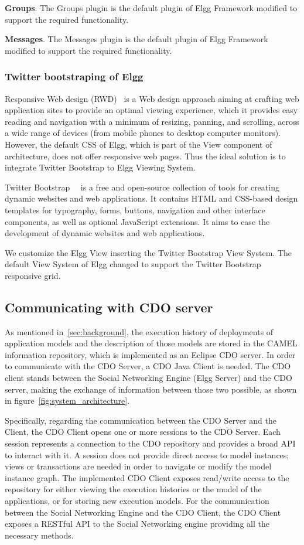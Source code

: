 \textbf{Groups}. The Groups plugin is the default plugin of Elgg Framework modified to support the required functionality.

\textbf{Messages}. The Messages plugin is the default plugin of Elgg Framework modified to support the required functionality.

\subsubsection{Twitter bootstraping of Elgg}
Responsive Web design (RWD)~\cite{natda2013responsive} is a Web design approach aiming at crafting web application sites to provide an optimal viewing experience, which it provides easy reading and navigation with a minimum of resizing, panning, and scrolling, across a wide range of devices (from mobile phones to desktop computer monitors). However, the default CSS of Elgg, which is part of the View component of architecture, does not offer responsive web pages. Thus the ideal solution is to integrate Twitter Bootstrap to Elgg Viewing System. 

Twitter Bootstrap~\cite{twitter_bootstrap}~\cite{cochran2012twitter} is a free and open-source collection of tools for creating dynamic websites and web applications. It contains HTML and CSS-based design templates for typography, forms, buttons, navigation and other interface components, as well as optional JavaScript extensions. It aims to ease the development of dynamic websites and web applications. 

We customize the Elgg View inserting the Twitter Bootstrap View System. The default View System of Elgg changed to support the Twitter Bootstrap responsive grid.

\subsection{Communicating with CDO server}
\label{sec:cdo_comm}
As mentioned in~\ref{sec:background}, the execution history of deployments of application models and the description of those models are stored in the CAMEL information repository, which is implemented as an Eclipse CDO server. In order to communicate with the CDO Server, a CDO Java Client is needed. The CDO client stands between the Social Networking Engine (Elgg Server) and the CDO server, making the exchange of information between those two possible, as shown in figure~\ref{fig:system_architecture}.

Specifically, regarding the communication between the CDO Server and the Client, the CDO Client opens one or more sessions to the CDO Server. Each session represents a connection to the CDO repository and provides a broad API to interact with it. A session does not provide direct access to model instances; views or transactions are needed in order to navigate or modify the model instance graph. The implemented CDO Client exposes read/write access to the repository for either viewing the execution histories or the model of the applications, or for storing new execution models. For the communication between the Social Networking Engine and the CDO Client, the CDO Client exposes a RESTful API to the Social Networking engine providing all the necessary methods. 

